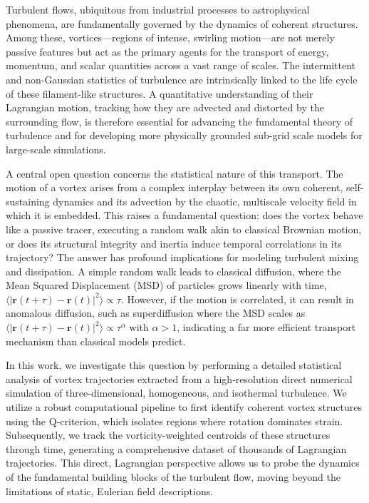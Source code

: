 \documentclass[]{article}
\begin{document}
Turbulent flows, ubiquitous from industrial processes to astrophysical phenomena, are fundamentally governed by the dynamics of coherent structures. Among these, vortices—regions of intense, swirling motion—are not merely passive features but act as the primary agents for the transport of energy, momentum, and scalar quantities across a vast range of scales. The intermittent and non-Gaussian statistics of turbulence are intrinsically linked to the life cycle of these filament-like structures. A quantitative understanding of their Lagrangian motion, tracking how they are advected and distorted by the surrounding flow, is therefore essential for advancing the fundamental theory of turbulence and for developing more physically grounded sub-grid scale models for large-scale simulations.

A central open question concerns the statistical nature of this transport. The motion of a vortex arises from a complex interplay between its own coherent, self-sustaining dynamics and its advection by the chaotic, multiscale velocity field in which it is embedded. This raises a fundamental question: does the vortex behave like a passive tracer, executing a random walk akin to classical Brownian motion, or does its structural integrity and inertia induce temporal correlations in its trajectory? The answer has profound implications for modeling turbulent mixing and dissipation. A simple random walk leads to classical diffusion, where the Mean Squared Displacement (MSD) of particles grows linearly with time, $\langle |\mathbf{r}(t+\tau) - \mathbf{r}(t)|^2 \rangle \propto \tau$. However, if the motion is correlated, it can result in anomalous diffusion, such as superdiffusion where the MSD scales as $\langle |\mathbf{r}(t+\tau) - \mathbf{r}(t)|^2 \rangle \propto \tau^\alpha$ with $\alpha > 1$, indicating a far more efficient transport mechanism than classical models predict.

In this work, we investigate this question by performing a detailed statistical analysis of vortex trajectories extracted from a high-resolution direct numerical simulation of three-dimensional, homogeneous, and isothermal turbulence. We utilize a robust computational pipeline to first identify coherent vortex structures using the Q-criterion, which isolates regions where rotation dominates strain. Subsequently, we track the vorticity-weighted centroids of these structures through time, generating a comprehensive dataset of thousands of Lagrangian trajectories. This direct, Lagrangian perspective allows us to probe the dynamics of the fundamental building blocks of the turbulent flow, moving beyond the limitations of static, Eulerian field descriptions.
\end{document}
